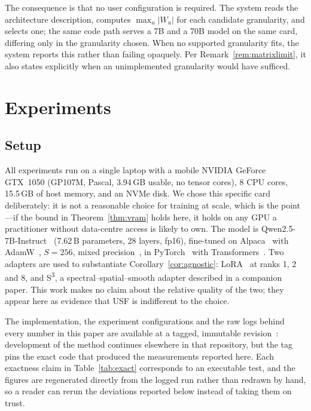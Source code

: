 \documentclass[preprint,12pt]{elsarticle}
\newcommand{\usf}{USF}
\newcommand{\Wu}{\lvert W_u \rvert}
\newcommand{\sthree}{S\textsuperscript{3}}
\begin{document}
The consequence is that no user configuration is required. The system reads the architecture
description, computes $\max_u \Wu$ for each candidate granularity, and selects one; the same code
path serves a 7B and a 70B model on the same card, differing only in the granularity chosen. When
no supported granularity fits, the system reports this rather than failing opaquely. Per
Remark~\ref{rem:matrixlimit}, it also states explicitly when an unimplemented granularity would have
sufficed.

\section{Experiments}
\label{sec:exp}

\subsection{Setup}

All experiments run on a single laptop with a mobile NVIDIA GeForce GTX~1050 (GP107M, Pascal,
3.94\,GB usable, no tensor cores), 8 CPU cores, 15.5\,GB of host memory, and an NVMe disk. We chose
this specific card deliberately: it is not a reasonable choice for training at scale, which is the
point---if the bound in Theorem~\ref{thm:vram} holds here, it holds on any GPU a practitioner without
data-centre access is likely to own. The model is
Qwen2.5-7B-Instruct~\cite{qwen2025} (7.62\,B parameters, 28 layers, fp16), fine-tuned on
Alpaca~\cite{alpaca2023} with AdamW~\cite{loshchilov2019adamw}, $S=256$, mixed
precision~\cite{micikevicius2018mixed}, in PyTorch~\cite{paszke2019pytorch} with
Transformers~\cite{wolf2020transformers}. Two adapters are used to substantiate
Corollary~\ref{cor:agnostic}: LoRA~\cite{hu2022lora} at ranks 1, 2 and 8, and \sthree{}, a
spectral--spatial--smooth adapter described in a companion paper. This work makes no claim about
the relative quality of the two; they appear here as evidence that \usf{} is indifferent to the
choice.

The implementation, the experiment configurations and the raw logs behind every number in this
paper are available at a tagged, immutable revision~\cite{usfcode}: development of the method
continues elsewhere in that repository, but the tag pins the exact code that produced the
measurements reported here. Each exactness claim in Table~\ref{tab:exact} corresponds to an executable
test, and the figures are regenerated directly from the logged run rather than redrawn by hand, so
a reader can rerun the deviations reported below instead of taking them on trust.
\end{document}
